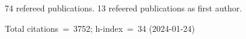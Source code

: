 74 refereed publications. 13 refeered publications as first author.

Total citations~=~3752; h-index~=~34 (2024-01-24)